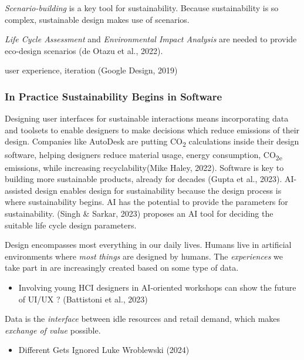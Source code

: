 \documentclass[
  letterpaper,
  DIV=11,
  numbers=noendperiod]{scrartcl}
\providecommand{\tightlist}{%
  \setlength{\itemsep}{0pt}\setlength{\parskip}{0pt}}\usepackage{longtable,booktabs,array}
\begin{document}
\emph{Scenario-building} is a key tool for sustainability. Because
sustainability is so complex, sustainable design makes use of scenarios.

\emph{Life Cycle Assessment} and \emph{Environmental Impact Analysis}
are needed to provide eco-design scenarios (de Otazu et al., 2022).

user experience, iteration (Google Design, 2019)

\subsubsection{In Practice Sustainability Begins in
Software}\label{in-practice-sustainability-begins-in-software}

Designing user interfaces for sustainable interactions means
incorporating data and toolsets to enable designers to make decisions
which reduce emissions of their design. Companies like AutoDesk are
putting CO\textsubscript{2} calculations inside their design software,
helping designers reduce material usage, energy consumption,
CO\textsubscript{2e} emissions, while increasing recyclability(Mike
Haley, 2022). Software is key to building more sustainable products,
already for decades (Gupta et al., 2023). AI-assisted design enables
design for sustainability because the design process is where
sustainability begins. AI has the potential to provide the parameters
for sustainability. (Singh \& Sarkar, 2023) proposes an AI tool for
deciding the suitable life cycle design parameters.

Design encompasses most everything in our daily lives. Humans live in
artificial environments where \emph{most} \emph{things} are designed by
humans. The \emph{experiences} we take part in are increasingly created
based on some type of data.

\begin{itemize}
\tightlist
\item
  Involving young HCI designers in AI-oriented workshops can show the
  future of UI/UX ? (Battistoni et al., 2023)
\end{itemize}

Data is the \emph{interface} between idle resources and retail demand,
which makes \emph{exchange of value} possible.

\begin{itemize}
\tightlist
\item
  Different Gets Ignored Luke Wroblewski (2024)
\end{itemize}
\end{document}
